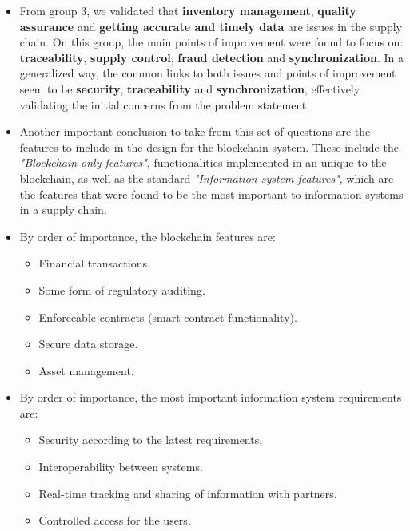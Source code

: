 \begin{itemize}
    \item From group 3, we validated that \textbf{inventory management}, \textbf{quality assurance} and \textbf{getting accurate and timely data} are issues in the supply chain. On this group, the main points of improvement were found to focus on: \textbf{traceability}, \textbf{supply control}, \textbf{fraud detection} and \textbf{synchronization}. In a generalized way, the common links to both issues and points of improvement seem to be \textbf{security}, \textbf{traceability} and \textbf{synchronization}, effectively validating the initial concerns from the problem statement.
    \item Another important conclusion to take from this set of questions are the features to include in the design for the blockchain system. These include the \textit{"Blockchain only features"}, functionalities implemented in an unique to the blockchain, as well as the standard \textit{"Information system features"}, which are the features that were found to be the most important to information systems in a supply chain.
    \item By order of importance, the blockchain features are:
    \begin{itemize}
        \item Financial transactions.
        \item Some form of regulatory auditing.
        \item Enforceable contracts (smart contract functionality).
        \item Secure data storage.
        \item Asset management.
    \end{itemize}
    \item By order of importance, the most important information system requirements are:
    \begin{itemize}
        \item Security according to the latest requirements.
        \item Interoperability between systems.
        \item Real-time tracking and sharing of information with partners.
        \item Controlled access for the users.
    \end{itemize}
\end{itemize}











